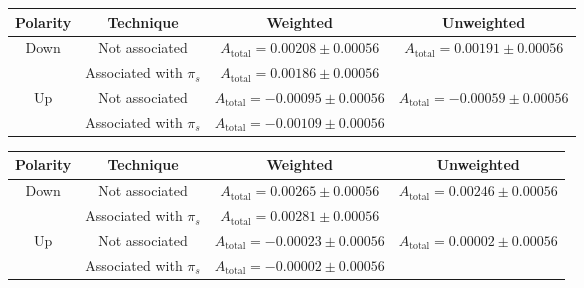 \documentclass{article}
\begin{document}
        \begin{center}
                \begin{tabular}{c|c|c|c}
                        Polarity & Technique & Weighted & Unweighted\\
                        \hline\hline
                        \multirow{2}{*}{Down} & Not associated & $A_\text{total} = 0.00208\pm 0.00056$ & \multirow{2}{*}{$A_\text{total} = 0.00191\pm 0.00056$}\\
                        \cline{2-3}
                        & Associated with $\pi_s$ & $A_\text{total} = 0.00186\pm 0.00056$ & \\
                        \hline
                        \multirow{2}{*}{Up} & Not associated & $A_\text{total} = - 0.00095\pm 0.00056$ & \multirow{2}{*}{$A_\text{total} = - 0.00059 \pm 0.00056$}\\
                        \cline{2-3}
                        & Associated with $\pi_s$ & $A_\text{total} = - 0.00109\pm 0.00056$ & \\
                \end{tabular}
                \label{tab:2017}
        \end{center}
        \begin{center}
                \begin{tabular}{c|c|c|c}
                        Polarity & Technique & Weighted & Unweighted\\
                        \hline\hline
                        \multirow{2}{*}{Down} & Not associated & $A_\text{total} = 0.00265 \pm 0.00056$ & \multirow{2}{*}{$A_\text{total} = 0.00246 \pm 0.00056$}\\
                        \cline{2-3}
                        & Associated with $\pi_s$ & $A_\text{total} = 0.00281\pm 0.00056$ & \\
                        \hline
                        \multirow{2}{*}{Up} & Not associated & $A_\text{total} = - 0.00023\pm 0.00056$ & \multirow{2}{*}{$A_\text{total} = 0.00002\pm 0.00056$}\\
                        \cline{2-3}
                        & Associated with $\pi_s$ & $A_\text{total} = - 0.00002\pm 0.00056$ & \\
                \end{tabular}
                \label{tab:2018}
        \end{center}
\end{document}

